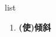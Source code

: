
\begin{frame}
{\huge list}
\begin{center}
\begin{enumerate}\Large
  \item \textbf{(使)倾斜}
\end{enumerate}
\end{center}
\end{frame}
